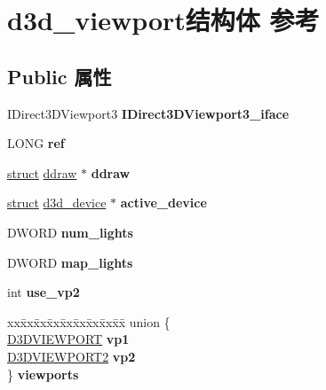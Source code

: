 \hypertarget{structd3d__viewport}{}\section{d3d\+\_\+viewport结构体 参考}
\label{structd3d__viewport}
\subsection*{Public 属性}
\begin{DoxyCompactItemize}
\item 
\mbox{\label{structd3d__viewport_a4553f04e2d7763094ffd67c7c304f31d}} 
I\+Direct3\+D\+Viewport3 {\bfseries I\+Direct3\+D\+Viewport3\+\_\+iface}
\item 
\mbox{\label{structd3d__viewport_a42569ae36008334cd9da313f03fedfa9}} 
L\+O\+NG {\bfseries ref}
\item 
\mbox{\label{structd3d__viewport_a35016fac6c1bc8c80999a2ed0d78311f}} 
\hyperlink{interfacestruct}{struct} \hyperlink{structddraw}{ddraw} $\ast$ {\bfseries ddraw}
\item 
\mbox{\label{structd3d__viewport_a3837be799b4915db057814d3fc174229}} 
\hyperlink{interfacestruct}{struct} \hyperlink{structd3d__device}{d3d\+\_\+device} $\ast$ {\bfseries active\+\_\+device}
\item 
\mbox{\label{structd3d__viewport_a04e68a89306ccd6401f6162a2e176fcc}} 
D\+W\+O\+RD {\bfseries num\+\_\+lights}
\item 
\mbox{\label{structd3d__viewport_a1a648fb52c58d3d5f5604136895a1253}} 
D\+W\+O\+RD {\bfseries map\+\_\+lights}
\item 
\mbox{\label{structd3d__viewport_a0d915c2985f67a3581ba9cb15da0400b}} 
int {\bfseries use\+\_\+vp2}
\item 
\mbox{\label{structd3d__viewport_a793c33ffc130210aca3448b8e2817117}} 
\begin{tabbing}
xx\=xx\=xx\=xx\=xx\=xx\=xx\=xx\=xx\=\kill
union \{\\
\>\hyperlink{struct___d3_d_v_i_e_w_p_o_r_t}{D3DVIEWPORT} {\bfseries vp1}\\
\>\hyperlink{struct___d3_d_v_i_e_w_p_o_r_t2}{D3DVIEWPORT2} {\bfseries vp2}\\
\} {\bfseries viewports}\\


\end{tabbing}
\end{DoxyCompactItemize}
